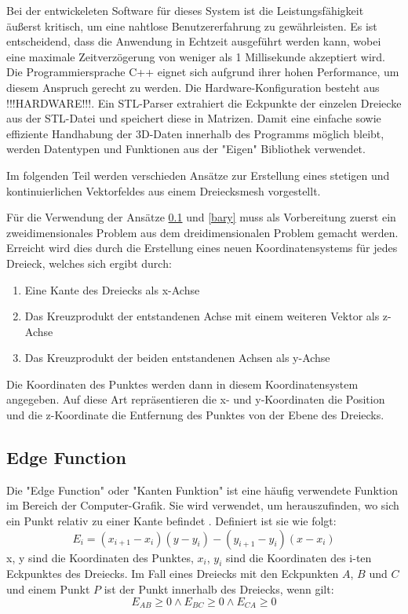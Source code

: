 \documentclass[conference]{IEEEtran}
\begin{document}
Bei der entwickeleten Software für dieses System ist die Leistungsfähigkeit äußerst kritisch, 
um eine nahtlose Benutzererfahrung zu gewährleisten. Es ist entscheidend, dass die Anwendung in 
Echtzeit ausgeführt werden kann, wobei eine maximale 
Zeitverzögerung von weniger als 1 Millisekunde akzeptiert wird. Die Programmiersprache 
C++ eignet sich aufgrund ihrer hohen Performance, um diesem Anspruch gerecht zu werden. 
Die Hardware-Konfiguration besteht aus !!!HARDWARE!!!.
Ein STL-Parser extrahiert die Eckpunkte der einzelen Dreiecke aus der STL-Datei und speichert diese in Matrizen. 
Damit eine einfache sowie effiziente Handhabung der 3D-Daten innerhalb des Programms möglich bleibt, werden 
Datentypen und Funktionen aus der "Eigen" Bibliothek verwendet. 

Im folgenden Teil werden verschieden Ansätze zur Erstellung eines stetigen und kontinuierlichen Vektorfeldes aus einem 
Dreiecksmesh vorgestellt. 

Für die Verwendung der Ansätze \ref*{edge} und \ref*{bary} muss als Vorbereitung zuerst ein zweidimensionales 
Problem aus dem dreidimensionalen Problem gemacht werden. Erreicht wird dies durch die Erstellung eines neuen 
Koordinatensystems für jedes Dreieck, welches sich ergibt durch:
\begin{enumerate}
    \item Eine Kante des Dreiecks als x-Achse
    \item Das Kreuzprodukt der entstandenen Achse mit einem weiteren Vektor als z-Achse
    \item Das Kreuzprodukt der beiden entstandenen Achsen als y-Achse
\end{enumerate}
Die Koordinaten des Punktes werden dann in diesem Koordinatensystem angegeben. Auf diese Art 
repräsentieren die x- und y-Koordinaten die Position und die z-Koordinate die Entfernung des Punktes 
von der Ebene des Dreiecks. 

\subsection{Edge Function}\label{edge}
Die "Edge Function" oder "Kanten Funktion" ist eine häufig verwendete Funktion im Bereich der Computer-Grafik. Sie wird 
verwendet, um herauszufinden, wo sich ein Punkt relativ zu einer Kante befindet \autocite{pinedaParallelAlgorithmPolygon1988}. 
Definiert ist sie wie folgt:
\begin{equation}
    E_{i} = (x_{i+1} - x_{i})(y - y_{i}) - (y_{i+1} - y_{i})(x - x_{i})
\end{equation}
x, y sind die Koordinaten des Punktes, $x_{i}$, $y_{i}$ sind die Koordinaten des i-ten Eckpunktes 
des Dreiecks.
Im Fall eines Dreiecks mit den Eckpunkten $A$, $B$ und $C$ und einem Punkt $P$ ist der Punkt innerhalb 
des Dreiecks, wenn gilt:
\begin{equation}
    E_{AB} \geq 0 \land E_{BC} \geq 0 \land E_{CA} \geq 0
\end{equation}
\end{document}
